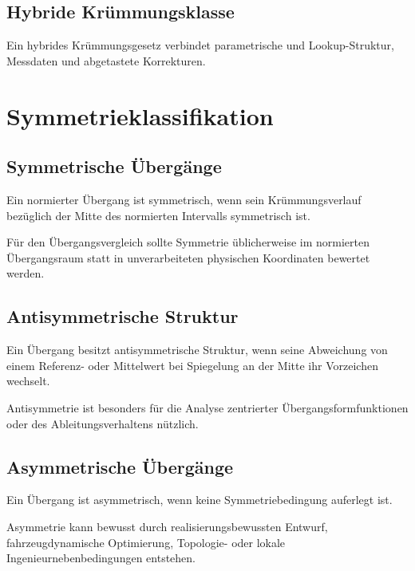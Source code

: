 \subsection{Hybride Krümmungsklasse}
\begin{definition}
\label{def:hybrid-curvature-class}
Ein hybrides Krümmungsgesetz verbindet parametrische und Lookup-Struktur,
Messdaten und abgetastete Korrekturen.
\end{definition}

\section{Symmetrieklassifikation}

\subsection{Symmetrische Übergänge}
\begin{definition}
\label{def:classification-symmetric-transition}
Ein normierter Übergang ist symmetrisch, wenn sein Krümmungsverlauf bezüglich
der Mitte des normierten Intervalls symmetrisch ist.
\end{definition}
Für den Übergangsvergleich sollte Symmetrie üblicherweise im normierten
Übergangsraum statt in unverarbeiteten physischen Koordinaten bewertet werden.

\subsection{Antisymmetrische Struktur}
\begin{definition}
\label{def:classification-antisymmetric-transition}
Ein Übergang besitzt antisymmetrische Struktur, wenn seine Abweichung von
einem Referenz- oder Mittelwert bei Spiegelung an der Mitte ihr Vorzeichen
wechselt.
\end{definition}
Antisymmetrie ist besonders für die Analyse zentrierter
Übergangsformfunktionen oder des Ableitungsverhaltens nützlich.

\subsection{Asymmetrische Übergänge}
\begin{definition}
\label{def:classification-asymmetric-transition}
Ein Übergang ist asymmetrisch, wenn keine Symmetriebedingung auferlegt ist.
\end{definition}
Asymmetrie kann bewusst durch realisierungsbewussten Entwurf,
fahrzeugdynamische Optimierung, Topologie- oder lokale
Ingenieurnebenbedingungen entstehen.

